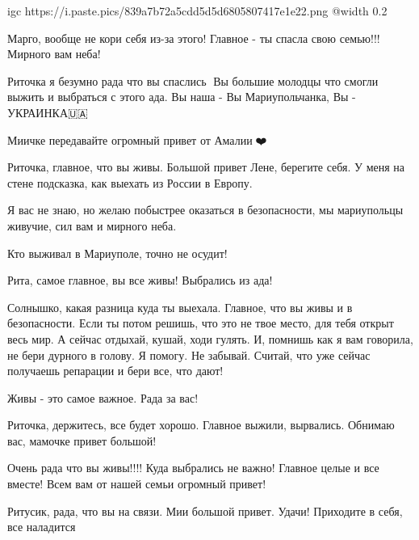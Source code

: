 \ifcmt
  igc https://i.paste.pics/839a7b72a5cdd5d5d6805807417e1e22.png
	@width 0.2
\fi


Марго, вообще не кори себя из-за этого! Главное - ты спасла свою семью!!! Мирного вам неба!


Риточка я безумно рада что вы спаслись🙏 Вы большие молодцы что смогли выжить и
выбраться с этого ада. Вы наша - Вы Мариупольчанка, Вы - УКРАИНКА🇺🇦


Миичке передавайте огромный привет от Амалии🤗❤️


Риточка, главное, что вы живы. Большой привет Лене, берегите себя. У меня на
стене подсказка, как выехать из России в Европу.


Я вас не знаю, но желаю побыстрее оказаться в безопасности, мы мариупольцы
живучие, сил вам и мирного неба.


Кто выживал в Мариуполе, точно не осудит!


Рита, самое главное, вы все живы! Выбрались из ада!


Солнышко, какая разница куда ты выехала. Главное, что вы живы и в безопасности.
Если ты потом решишь, что это не твое место, для тебя открыт весь мир. А сейчас
отдыхай, кушай, ходи гулять. И, помнишь как я вам говорила, не бери дурного в
голову. Я помогу. Не забывай. Считай, что уже сейчас получаешь репарации и бери
все, что дают!


Живы - это самое важное. Рада за вас!


Риточка, держитесь, все будет хорошо. Главное выжили, вырвались.
Обнимаю вас, мамочке привет большой! 💋


Очень рада что вы живы!!!! Куда выбрались не важно! Главное целые и все вместе!
Всем вам от нашей семьи огромный привет!


Ритусик, рада, что вы на связи. Мии большой привет. Удачи! Приходите в себя,
все наладится

